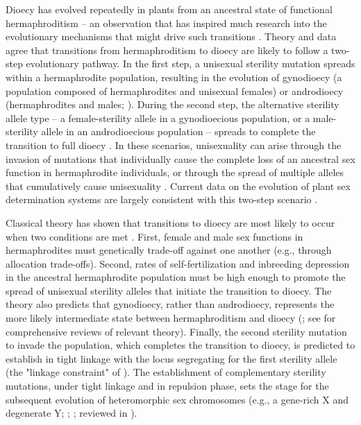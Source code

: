 \documentclass{article}
\newcommand\hl[1]{%
  \bgroup
  \hskip0pt\color{blue!80!black}%
  #1%
  \egroup
}
\begin{document}
Dioecy has evolved repeatedly in plants from an ancestral state of functional hermaphroditism -- an observation that has inspired much research into the evolutionary mechanisms that might drive such transitions \citep{Westergaard1958, SakaiWeller1999, Charlesworth2006, Bachtrog2014, Renner2014, GoldbergOtto2017, KaferPannell2017}. Theory and data agree that transitions from hermaphroditism to dioecy are likely to follow a two-step evolutionary pathway. In the first step, \hl{a unisexual sterility mutation spreads within a hermaphrodite population, resulting in the evolution of gynodioecy (a population composed of hermaphrodites and unisexual females) or androdioecy (hermaphrodites and males; \citealt{Charlesworth1978a, Charlesworth1978b}). During the second step, the alternative sterility allele type -- a female-sterility allele in a gynodioecious population, or a male-sterility allele in an androdioecious population -- spreads to complete the transition to full dioecy \citep{Westergaard1958, Charlesworth1978a, Charlesworth1978b, Charlesworth2006, Charlesworth2009, KaferPannell2017}. In these scenarios, unisexuality can arise through the invasion of mutations that individually cause the complete loss of an ancestral sex function in hermaphrodite individuals, or through the spread of multiple alleles that cumulatively cause unisexuality} \citep{Charlesworth1978a, Charlesworth1978b, Morgan1992a, Morgan1992b, SegerEckhart1996, Charlesworth1999}. Current data on the evolution of plant sex determination systems are largely consistent with this two-step scenario \citep{Westergaard1958, Charlesworth2002, Charlesworth2006, Renner2014, Ashman2015}.

Classical theory has shown that transitions to dioecy are most likely to occur when two conditions are met \citep{Lewis1941, Lloyd1975, Lloyd1976, Charlesworth1978a, Morgan1992a, SegerEckhart1996}. First, female and male sex functions in hermaphrodites must genetically trade-off against one another (e.g., through allocation trade-offs). Second, rates of self-fertilization and inbreeding depression in the ancestral hermaphrodite population must be high enough to promote the spread of unisexual sterility alleles that initiate the transition to dioecy. \hl{The theory also predicts that gynodioecy, rather than androdioecy, represents the more likely intermediate state between hermaphroditism and dioecy} (\citealt{Lloyd1975, Charlesworth1978a, SegerEckhart1996, KaferPannell2017}; see \citealt{Charlesworth1999, Charlesworth2006} for comprehensive reviews of relevant theory). Finally, the second sterility mutation to invade the population, which completes the transition to dioecy, is predicted to establish in tight linkage with the locus segregating for the first sterility allele (the "linkage constraint" of \citealt{Charlesworth1978a}). The establishment of complementary sterility mutations, under tight linkage and in repulsion phase, sets the stage for the subsequent evolution of heteromorphic sex chromosomes (e.g., a gene-rich X and degenerate Y; \citealt[pp.265--269]{Bull1983}; \citealt{Rice1987, Qiuetal2013}; reviewed in \citealt{Bachtrog2006,Charlesworth2002}). 
\end{document}
